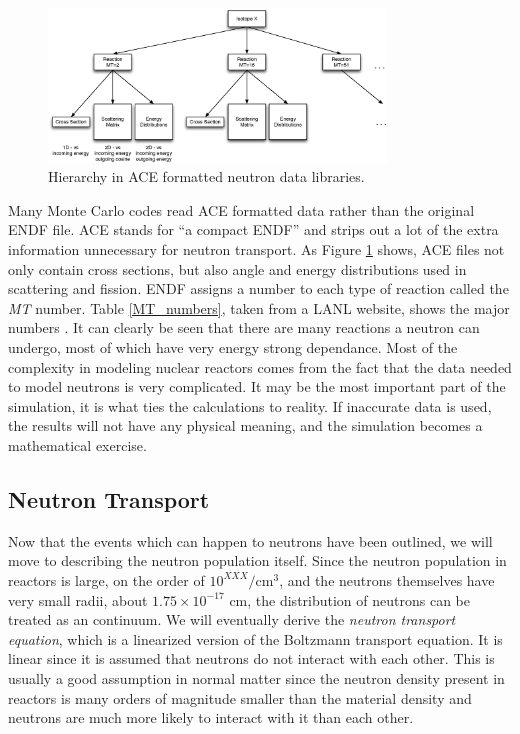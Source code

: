 \begin{figure}[h!]
  \label{data_levels}
  \centering
    \includegraphics[width=0.8\textwidth]{graphics/data_levels.eps}
     \caption{Hierarchy in ACE formatted neutron data libraries.}
\end{figure}

Many Monte Carlo codes read ACE formatted data rather than the original ENDF file.  ACE stands for ``a compact ENDF'' and strips out a lot of the extra information unnecessary for neutron transport.  As Figure \ref{data_levels} shows, ACE files not only contain cross sections, but also angle and energy distributions used in scattering and fission.  ENDF assigns a number to each type of reaction called the \emph{MT} number.  Table \ref{MT_numbers}, taken from a LANL website, shows the major numbers \cite{MTnums}.  It can clearly be seen that there are many reactions a neutron can undergo, most of which have very energy strong dependance.  Most of the complexity in modeling nuclear reactors comes from the fact that the data needed to model neutrons is very complicated.  It may be the most important part of the simulation, it is what ties the calculations to reality.  If inaccurate data is used, the results will not have any physical meaning, and the simulation becomes a mathematical exercise. 

\subsection{Neutron Transport}

Now that the events which can happen to neutrons have been outlined, we will move to describing the neutron population itself.  Since the neutron population in reactors is large, on the order of $10^{XXX}/\mathrm{cm}^3$, and the neutrons themselves have very small radii, about $1.75\times10^{-17}$ cm, the distribution of neutrons can be treated as an continuum.  We will eventually derive the \emph{neutron transport equation}, which is a linearized version of the Boltzmann transport equation.  It is linear since it is assumed that neutrons do not interact with each other.  This is usually a good assumption in normal matter since the neutron density present in reactors is many orders of magnitude smaller than the material density and neutrons are much more likely to interact with it than each other.  


